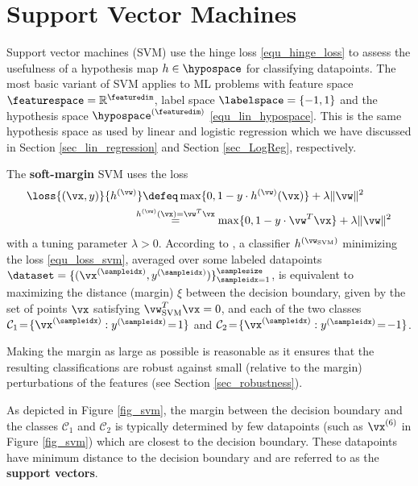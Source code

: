 \documentclass[12pt]{report}
\begin{document}
\section{Support Vector Machines} 
\label{sec_SVM} 
Support vector machines (SVM) use the hinge loss \eqref{equ_hinge_loss} to 
assess the usefulness of a hypothesis map $h \in \hypospace$ for classifying datapoints. 
The most basic variant of SVM applies to ML problems with feature space 
$\featurespace=\mathbb{R}^{\featuredim}$, label space $\labelspace = \{-1,1\}$ 
and the hypothesis space $\hypospace^{(\featuredim)}$ \eqref{equ_lin_hypospace}. 
This is the same hypothesis space as used by linear and logistic regression 
which we have discussed in Section \ref{sec_lin_regression} and Section \ref{sec_LogReg}, 
respectively. 

The {\bf soft-margin} SVM \cite[Chapter 2]{LampertNowKernel} uses the loss  
\begin{align}
\loss{(\vx,y)}{h^{(\vw)}} & \defeq  \max \{ 0 , 1 - y\cdot h^{(\vw)}(\vx) \}  + \lambda \| \vw \|^{2} \nonumber \\
   & \hspace*{-3mm}\stackrel{h^{(\vw)}(\vx) = \vw^{T} \vx}{=}  \max \{ 0 , 1 - y\cdot \vw^{T} \vx \} + \lambda \| \vw \|^{2} \label{equ_loss_svm}
\end{align}
with a tuning parameter $\lambda >0$. According to \cite[Chapter 2]{LampertNowKernel}, a classifier $h^{(\vw_{\rm SVM})}$ 
minimizing the loss \eqref{equ_loss_svm}, averaged over some labeled datapoints $\dataset = \{ ( \vx^{(\sampleidx)}, y^{(\sampleidx)}) \}_{\sampleidx=1}^{\samplesize}$, 
is equivalent to maximizing the distance (margin) $\xi$ between 
the decision boundary, given by the set of points $\vx$ satisfying 
$\vw_{\rm SVM}^{T} \vx=0$, and each of the two classes 
$\mathcal{C}_{1}\!=\!\{ \vx^{(\sampleidx)} : y^{(\sampleidx)}\!=\!1\}$ and 
$\mathcal{C}_{2}\!=\!\{ \vx^{(\sampleidx)} : y^{(\sampleidx)}\!=\!-1 \}$. 

Making the margin as large as possible is reasonable as it ensures 
that the resulting classifications are robust against small (relative 
to the margin) perturbations of the features (see Section \ref{sec_robustness}). 

As depicted in Figure \ref{fig_svm}, the margin between the decision 
boundary and the classes $\mathcal{C}_{1}$ and $\mathcal{C}_{2}$ 
is typically determined by few datapoints (such as $\vx^{(6)}$ in 
Figure \ref{fig_svm}) which are closest to the decision boundary. 
These datapoints have minimum distance to the decision boundary 
and are referred to as the {\bf support vectors}. 
\end{document}
